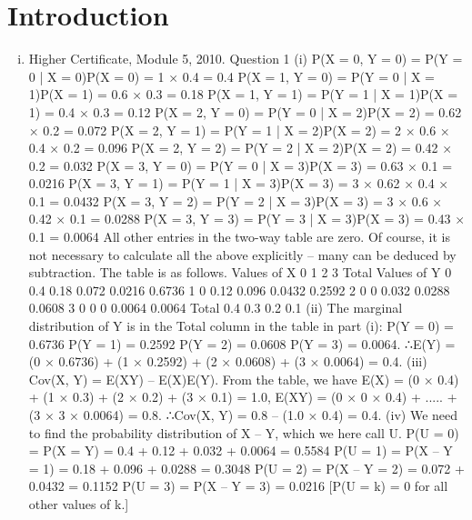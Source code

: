 \documentclass{article}
\author{kobriendublin }
\date{December 2018}
\begin{document}
\section{Introduction}
\begin{enumerate}[(i)]
\item 


Higher Certificate, Module 5, 2010. Question 1
(i) P(X = 0, Y = 0) = P(Y = 0 | X = 0)P(X = 0) = 1 × 0.4 = 0.4
P(X = 1, Y = 0) = P(Y = 0 | X = 1)P(X = 1) = 0.6 × 0.3 = 0.18
P(X = 1, Y = 1) = P(Y = 1 | X = 1)P(X = 1) = 0.4 × 0.3 = 0.12
P(X = 2, Y = 0) = P(Y = 0 | X = 2)P(X = 2) = 0.62 × 0.2 = 0.072
P(X = 2, Y = 1) = P(Y = 1 | X = 2)P(X = 2) = 2 × 0.6 × 0.4 × 0.2 = 0.096
P(X = 2, Y = 2) = P(Y = 2 | X = 2)P(X = 2) = 0.42 × 0.2 = 0.032
P(X = 3, Y = 0) = P(Y = 0 | X = 3)P(X = 3) = 0.63 × 0.1 = 0.0216
P(X = 3, Y = 1) = P(Y = 1 | X = 3)P(X = 3) = 3 × 0.62 × 0.4 × 0.1 = 0.0432
P(X = 3, Y = 2) = P(Y = 2 | X = 3)P(X = 3) = 3 × 0.6 × 0.42 × 0.1 = 0.0288
P(X = 3, Y = 3) = P(Y = 3 | X = 3)P(X = 3) = 0.43 × 0.1 = 0.0064
All other entries in the two-way table are zero. Of course, it is not necessary to calculate all the above explicitly – many can be deduced by subtraction. The table is as follows.
Values of X
0
1
2
3
Total
Values of Y
0
0.4
0.18
0.072
0.0216
0.6736
1
0
0.12
0.096
0.0432
0.2592
2
0
0
0.032
0.0288
0.0608
3
0
0
0
0.0064
0.0064
Total
0.4
0.3
0.2
0.1
(ii) The marginal distribution of Y is in the Total column in the table in part (i):
P(Y = 0) = 0.6736 P(Y = 1) = 0.2592 P(Y = 2) = 0.0608 P(Y = 3) = 0.0064.
∴E(Y) = (0 × 0.6736) + (1 × 0.2592) + (2 × 0.0608) + (3 × 0.0064) = 0.4.
(iii) Cov(X, Y) = E(XY) – E(X)E(Y). From the table, we have
E(X) = (0 × 0.4) + (1 × 0.3) + (2 × 0.2) + (3 × 0.1) = 1.0,
E(XY) = (0 × 0 × 0.4) + ..... + (3 × 3 × 0.0064) = 0.8.
∴Cov(X, Y) = 0.8 – (1.0 × 0.4) = 0.4.
(iv) We need to find the probability distribution of X – Y, which we here call U.
P(U = 0) = P(X = Y) = 0.4 + 0.12 + 0.032 + 0.0064 = 0.5584
P(U = 1) = P(X – Y = 1) = 0.18 + 0.096 + 0.0288 = 0.3048
P(U = 2) = P(X – Y = 2) = 0.072 + 0.0432 = 0.1152
P(U = 3) = P(X – Y = 3) = 0.0216
[P(U = k) = 0 for all other values of k.]
\end{enumerate}
\end{document}
